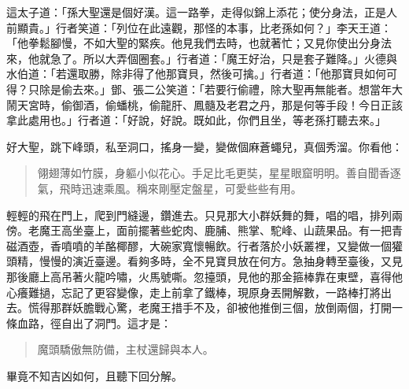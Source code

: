 這太子道：「孫大聖還是個好漢。這一路拳，走得似錦上添花；使分身法，正是人前顯貴。」行者笑道：「列位在此遠觀，那怪的本事，比老孫如何？」李天王道：「他拳鬆腳慢，不如大聖的緊疾。他見我們去時，也就著忙；又見你使出分身法來，他就急了。所以大弄個圈套。」行者道：「魔王好治，只是套子難降。」火德與水伯道：「若還取勝，除非得了他那寶貝，然後可擒。」行者道：「他那寶貝如何可得？只除是偷去來。」鄧、張二公笑道：「若要行偷禮，除大聖再無能者。想當年大鬧天宮時，偷御酒，偷蟠桃，偷龍肝、鳳髓及老君之丹，那是何等手段！今日正該拿此處用也。」行者道：「好說，好說。既如此，你們且坐，等老孫打聽去來。」

好大聖，跳下峰頭，私至洞口，搖身一變，變做個麻蒼蠅兒，真個秀溜。你看他：
\begin{quote}
翎翅薄如竹膜，身軀小似花心。手足比毛更奘，星星眼窟明明。善自聞香逐氣，飛時迅速乘風。稱來剛壓定盤星，可愛些些有用。
\end{quote}

輕輕的飛在門上，爬到門縫邊，鑽進去。只見那大小群妖舞的舞，唱的唱，排列兩傍。老魔王高坐臺上，面前擺著些蛇肉、鹿脯、熊掌、駝峰、山蔬果品。有一把青磁酒壺，香噴噴的羊酪椰醪，大碗家寬懷暢飲。行者落於小妖叢裡，又變做一個獾頭精，慢慢的演近臺邊。看夠多時，全不見寶貝放在何方。急抽身轉至臺後，又見那後廳上高吊著火龍吟嘯，火馬號嘶。忽擡頭，見他的那金箍棒靠在東壁，喜得他心癢難撾，忘記了更容變像，走上前拿了鐵棒，現原身丟開解數，一路棒打將出去。慌得那群妖膽戰心驚，老魔王措手不及，卻被他推倒三個，放倒兩個，打開一條血路，徑自出了洞門。這才是：
\begin{quote}
魔頭驕傲無防備，主杖還歸與本人。
\end{quote}

畢竟不知吉凶如何，且聽下回分解。
